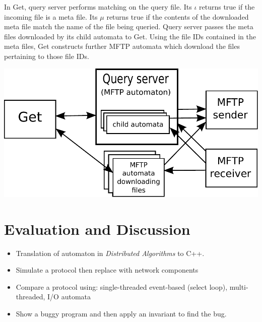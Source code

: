 \documentclass[letterpaper]{article}
\begin{document}
\vspace{2 mm}

In Get, query server performs matching on the query file.
Its $\iota$ returns true if the incoming file is a meta file.
Its $\mu$ returns true if the contents of the downloaded meta file match the name of the file being queried.
Query server passes the meta files downloaded by its child automata to Get.
Using the file IDs contained in the meta files, Get constructs further MFTP automata which download the files pertaining to those file IDs.

\vspace{2.5 mm}

\includegraphics[scale=0.65]{get_diagram}

\vspace{2 mm}


\section{Evaluation and Discussion\label{evaluation}}

\begin{itemize}
\item Translation of automaton in \emph{Distributed Algorithms} to C++.
\item Simulate a protocol then replace with network components
\item Compare a protocol using: single-threaded event-based (select loop), multi-threaded, I/O automata
\item Show a buggy program and then apply an invariant to find the bug.
\end{itemize}
\end{document}
